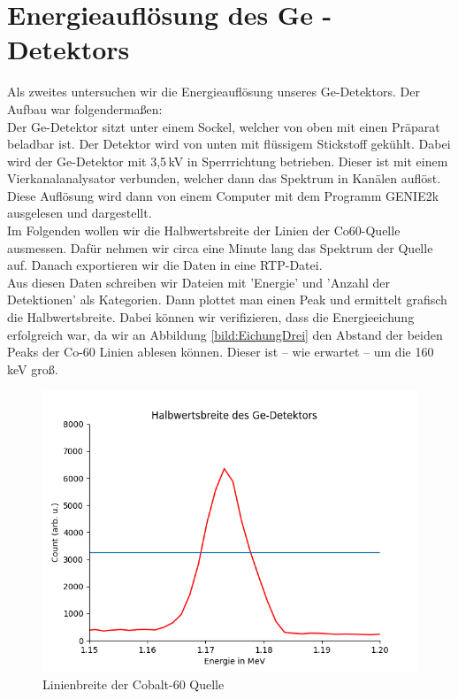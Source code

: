 \section{Energieauflösung des Ge - Detektors}

Als zweites untersuchen wir die Energieauflösung unseres Ge-Detektors. Der Aufbau war folgendermaßen:\\
Der Ge-Detektor sitzt unter einem Sockel, welcher von oben mit einen Präparat beladbar ist. Der Detektor wird von unten mit flüssigem 
Stickstoff gekühlt. Dabei wird der Ge-Detektor mit 3,5\,kV in Sperrrichtung betrieben. Dieser ist mit einem Vierkanalanalysator verbunden, 
welcher dann das 
Spektrum in Kanälen auflöst. Diese Auflösung wird dann von einem Computer mit dem Programm GENIE2k ausgelesen und dargestellt.\\
Im Folgenden wollen wir die Halbwertsbreite der Linien der Co60-Quelle ausmessen. Dafür nehmen wir circa eine Minute lang das Spektrum 
der Quelle auf. Danach exportieren wir die Daten in eine RTP-Datei.\\

Aus diesen Daten schreiben wir Dateien mit 'Energie' und 'Anzahl der Detektionen' als Kategorien. Dann plottet man einen Peak und ermittelt grafisch die Halbwertsbreite. 
Dabei können wir verifizieren, dass die Energieeichung erfolgreich war, da wir an Abbildung \ref{bild:EichungDrei} den Abstand der beiden Peaks der Co-60 Linien ablesen können. Dieser ist
– wie erwartet – um die 160 keV groß.  

\begin{figure}[ht]
    \centering
    \includegraphics[width = \linewidth]{Bilder/Auswertung/Halbwertsbreite.png}
    \caption{Linienbreite der Cobalt-60 Quelle}
    \label{bild:linienbreite}
\end{figure}

